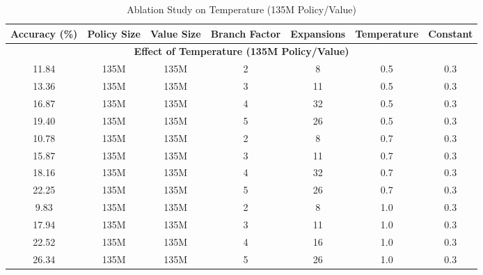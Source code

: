 \documentclass{article}
\begin{document}
\begin{table}[htbp]
    \centering
    \caption{Ablation Study on Temperature (135M Policy/Value)}
    \label{tab:temperature-analysis}
    \small
    \begin{tabular}{ccccccc}
        \toprule
        \textbf{Accuracy (\%)} & \textbf{Policy Size} & \textbf{Value Size} & \textbf{Branch Factor} & \textbf{Expansions} & \textbf{Temperature} & \textbf{Constant} \\
        \midrule
        \multicolumn{7}{c}{\textbf{Effect of Temperature (135M Policy/Value)}} \\
        \midrule
        11.84  & 135M & 135M & 2 & 8  & 0.5 & 0.3 \\
        13.36  & 135M & 135M & 3 & 11 & 0.5 & 0.3 \\
        16.87  & 135M & 135M & 4 & 32 & 0.5 & 0.3 \\ 
        19.40  & 135M & 135M & 5 & 26 & 0.5 & 0.3 \\
        \midrule
        10.78  & 135M & 135M & 2 & 8  & 0.7 & 0.3 \\
        15.87  & 135M & 135M & 3 & 11 & 0.7 & 0.3 \\
        18.16  & 135M & 135M & 4 & 32 & 0.7 & 0.3 \\
        22.25  & 135M & 135M & 5 & 26 & 0.7 & 0.3 \\
        \midrule
        9.83 & 135M & 135M & 2 & 8  & 1.0 & 0.3 \\
        17.94 & 135M & 135M & 3 & 11 & 1.0 & 0.3 \\
        22.52 & 135M & 135M & 4 & 16 & 1.0 & 0.3 \\
        26.34 & 135M & 135M & 5 & 26 & 1.0 & 0.3 \\
        \bottomrule
    \end{tabular}
\end{table}
\end{document}
